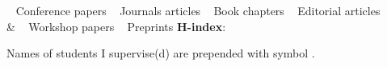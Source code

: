 
\smallskip
\begin{keywords}
{			 \faAngleRight~  Conference papers
\hspace{4pt} \faAngleRight~  Journals articles
\hspace{4pt} \faAngleRight~  Book chapters
\hspace{4pt} \faAngleRight~  Editorial articles
		 \\& \faAngleRight~  Workshop papers
\hspace{4pt} \faAngleRight~  Preprints
}
{\citNo \hspace{8pt} 
 \textbf{H-index}: \hIndex \hspace{8pt} 
 }%
\end{keywords}

Names of students I supervise(d) are prepended with symbol \student{}.


